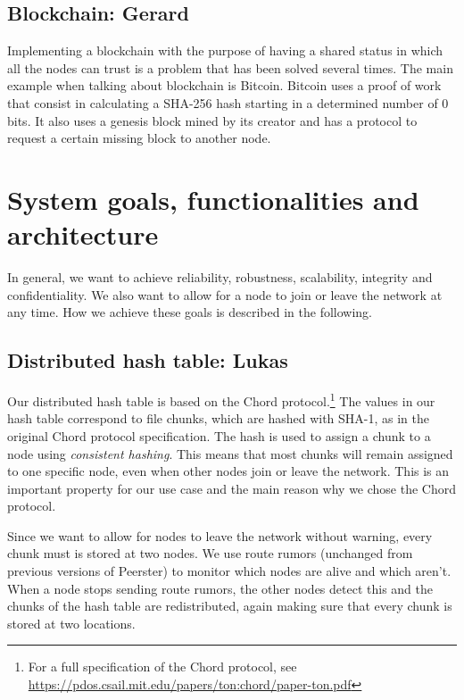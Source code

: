 \documentclass[12pt,a4paper,draft]{article}
\begin{document}
\subsection{Blockchain: Gerard}

Implementing a blockchain with the purpose of having a shared status in which all the nodes can trust is a problem that has been solved several times. The main example when talking about blockchain is Bitcoin. Bitcoin uses a proof of work that consist in calculating a SHA-256 hash starting in a determined number of 0 bits. It also uses a genesis block mined by its creator and has a protocol to request a certain missing block to another node.

\section{System goals, functionalities and architecture}

In general, we want to achieve reliability, robustness, scalability, integrity and confidentiality.
We also want to allow for a node to join or leave the network at any time.
How we achieve these goals is described in the following.

\subsection{Distributed hash table: Lukas}

Our distributed hash table is based on the Chord protocol.\footnote{For a full specification of the Chord protocol, see \url{https://pdos.csail.mit.edu/papers/ton:chord/paper-ton.pdf}}
The values in our hash table correspond to file chunks, which are hashed with SHA-1, as in the original Chord protocol specification.
The hash is used to assign a chunk to a node using \emph{consistent hashing}.
This means that most chunks will remain assigned to one specific node, even when other nodes join or leave the network.
This is an important property for our use case and the main reason why we chose the Chord protocol.

Since we want to allow for nodes to leave the network without warning, every chunk must is stored at two nodes.
We use route rumors (unchanged from previous versions of Peerster) to monitor which nodes are alive and which aren't.
When a node stops sending route rumors, the other nodes detect this and the chunks of the hash table are redistributed, again making sure that every chunk is stored at two locations.
\end{document}
